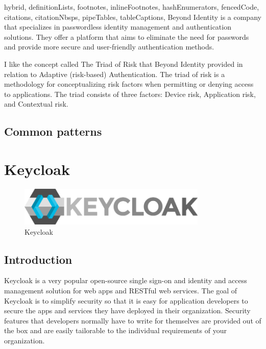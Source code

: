 \documentclass[
  digital,     %
  oneside,     %
  nosansbold,  %
  nocolorbold, %
  lof,         %
  lot,         %
]{fithesis4}
\begin{document}
\begin{markdown*}{%
  hybrid,
  definitionLists,
  footnotes,
  inlineFootnotes,
  hashEnumerators,
  fencedCode,
  citations,
  citationNbsps,
  pipeTables,
  tableCaptions,
}
Beyond Identity is a company that specializes in passwordless identity management and authentication solutions. They offer a platform that aims to eliminate the need for passwords and provide more secure and user-friendly authentication methods.

I like the concept called The Triad of Risk that Beyond Identity provided in relation to Adaptive (risk-based) Authentication.
The triad of risk is a methodology for conceptualizing risk factors when permitting or denying access to applications.
The triad consists of three factors: Device risk, Application risk, and Contextual risk.\cite{existing-beyond-identity}




\newpage
\section{Common patterns}

\chapter{Keycloak}

\begin{figure}[htbp]
  \centering
  \includegraphics[width=0.8\textwidth]{img/keycloak.png}
  \caption{Keycloak}
  \label{fig:keycloak-logo}
\end{figure}

\section{Introduction}
Keycloak is a very popular open-source single sign-on and identity and access management solution for web apps and RESTful web services.
The goal of Keycloak is to simplify security so that it is easy for application developers to secure the apps and services they have deployed in their organization.
Security features that developers normally have to write for themselves are provided out of the box and are easily tailorable to the individual requirements of your organization.


\end{markdown*}
\end{document}
